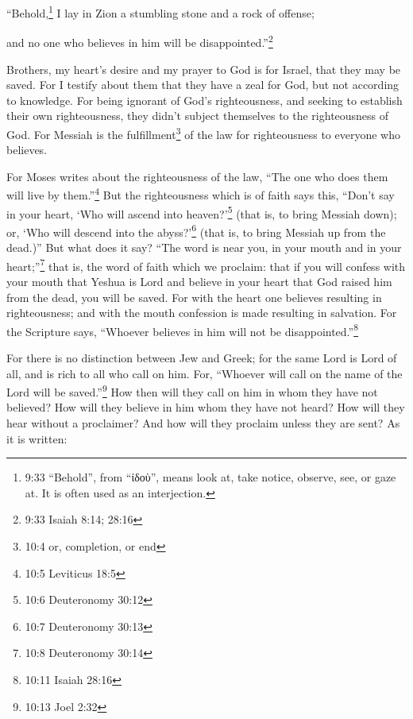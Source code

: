 “Behold,\footnote{9:33 “Behold”, from “ἰδοὺ”, means look at, take notice, observe, see, or gaze at. It is often used
	as an interjection.} I lay in Zion a stumbling stone and a rock of offense;

and no one who believes in him will be disappointed.”\footnote{9:33 Isaiah 8:14;
	28:16}


\setcounter{footnote}{0} %

\mychapter{} \myverse*{}Brothers, my heart’s desire and my prayer to God is for Israel,
that they may be saved.
\myverse{}For I testify about them that they have a zeal for God, but not according to
knowledge.
\myverse{}For being ignorant of God’s righteousness, and seeking to establish their own
righteousness, they didn’t subject themselves to the righteousness of God.
\myverse{}For Messiah is the fulfillment\footnote{10:4 or, completion, or end} of the law for righteousness to everyone who believes.

\myverse{}For Moses writes about the righteousness of the law, “The one
who does them will live by them.”\footnote{10:5 Leviticus 18:5}
\myverse{}But the righteousness which is of faith says this, “Don’t say in your heart,
‘Who will ascend into heaven?’\footnote{10:6 Deuteronomy 30:12} (that is, to bring Messiah down);
\myverse{}or, ‘Who will descend into the abyss?’\footnote{10:7 Deuteronomy 30:13} (that is, to bring Messiah up from the
dead.)”
\myverse{}But what does it say? “The word is near you, in your mouth and in your heart;”\footnote{10:8 Deuteronomy 30:14} that is, the word of faith which we proclaim:
\myverse{}that if you will confess with your mouth that Yeshua is Lord and believe in
your heart that God raised him from the dead, you will be saved.
\myverse{}For with the heart one believes resulting in righteousness; and with the
mouth confession is made resulting in salvation.
\myverse{}For the Scripture says, “Whoever believes in him will not be disappointed.”\footnote{10:11 Isaiah 28:16}

\myverse{}For there is no distinction between Jew and Greek; for the same
Lord is Lord of all, and is rich to all who call on him.
\myverse{}For, “Whoever will call on the name of the Lord will be saved.”\footnote{10:13 Joel 2:32}
\myverse{}How then will they call on him in whom they have not believed? How will they
believe in him whom they have not heard? How will they hear without a proclaimer?
\myverse{}And how will they proclaim unless they are sent? As it is written:

